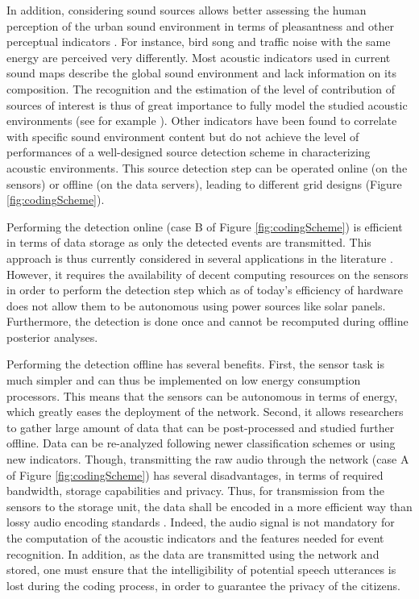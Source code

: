 \documentclass[sensors,article,accept,moreauthors,pdftex,10pt,a4paper]{mdpi}
\begin{document}
In addition, considering sound sources allows {better assessing} the human perception of the urban sound environment in terms of pleasantness and other perceptual indicators \cite{lavandier2006contribution, aumond2017}. For instance, {bird song} and traffic noise with the same energy are perceived very differently. Most acoustic indicators used in current sound maps describe the global sound environment and lack information on its composition. The recognition and the estimation of the level of contribution of sources of interest is thus of great importance to fully model the studied acoustic environments{ (see for example \cite{alsina2016design, app7020146, gloaguen2016estimating})}. Other indicators have been found to correlate with specific sound environment content \cite{aumond2017} but do not achieve the level of performances of a well-designed source detection scheme in characterizing acoustic environments. This source detection step can{ be} operated online (on the sensors) or offline {(on the data servers),} leading to different grid designs (Figure \ref{fig:codingScheme}).

Performing the detection online (case B of Figure \ref{fig:codingScheme}) is efficient in terms of data storage as only the detected events are transmitted. This approach is thus currently considered in several applications in the literature \cite{defreville2006automatic, mydlarz2017implementation, mydlarz2015design}. {However}, it requires the availability of decent computing resources on the sensors in order to perform the detection step which as of today's efficiency of hardware does not allow them to be autonomous using power sources like solar panels. Furthermore, the detection is done once and cannot be recomputed during offline posterior analyses.

Performing the detection offline has several benefits. First, the sensor task is much simpler and can thus be implemented on low energy consumption processors. This means that the sensors can be autonomous in terms of energy, which greatly eases the deployment of the network. Second, it allows researchers to gather large amount of data that can be post-processed and studied further offline. Data can be re-analyzed following newer classification schemes or using new indicators. Though, transmitting the raw audio  through the network (case A of Figure \ref{fig:codingScheme}) has several disadvantages, in terms of required bandwidth, storage capabilities and privacy. Thus, for transmission from the sensors to the storage unit, the data shall be encoded in a more efficient way than lossy audio encoding standards \cite{pan1995tutorial}. Indeed, the audio signal is not mandatory for the computation of the acoustic indicators and the features needed for event recognition. {In addition, as the data are} transmitted using the network and stored, one must ensure that the intelligibility of potential speech utterances is lost during the coding process, in order to guarantee the privacy of the citizens.
\end{document}
